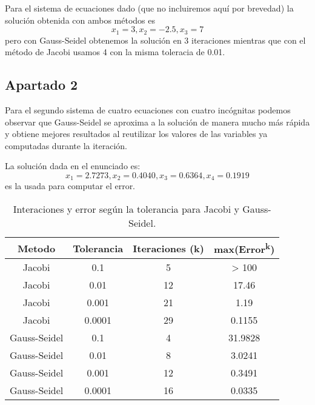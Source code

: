 Para el sistema de ecuaciones dado (que no incluiremos aquí por brevedad) la solución obtenida con ambos métodos es \[x_1=3 , x_2=-2.5 , x_3=7\] pero con Gauss-Seidel obtenemos la solución en 3 iteraciones mientras que con el método de Jacobi usamos 4 con la misma toleracia de 0.01.

\subsection{Apartado 2}

Para el segundo sistema de cuatro ecuaciones con cuatro incógnitas podemos observar que Gauss-Seidel se aproxima a la solución de manera mucho más rápida y obtiene mejores resultados al reutilizar los valores de las variables ya computadas durante la iteración.

La solución dada en el enunciado es: \[x_1=2.7273 , x_2 = 0.4040 , x_3 = 0.6364 , x_4 = 0.1919\] es la usada para computar el error.
\begin{table}
\begin{center}
\begin{tabular}{ |c|c|c|c| } 
 \hline 
 Metodo & Tolerancia & Iteraciones (k) & max(Error\textsuperscript{k}) \\ 
 \hline \hline
 Jacobi &  0.1 & 5 & > 100 \\
 \hline
 Jacobi &  0.01 & 12 & 17.46\\
 \hline
 Jacobi &  0.001 & 21 & 1.19\\
 \hline
 Jacobi &  0.0001 & 29 & 0.1155\\
 \hline
 Gauss-Seidel & 0.1 & 4 & 31.9828\\
 \hline
 Gauss-Seidel & 0.01 & 8 & 3.0241\\
 \hline
 Gauss-Seidel & 0.001 & 12 & 0.3491\\
 \hline
 Gauss-Seidel & 0.0001 & 16 &  0.0335\\
 \hline
\end{tabular}
\end{center}
\caption{Interaciones y error según la tolerancia para Jacobi y Gauss-Seidel.}
\end{table}